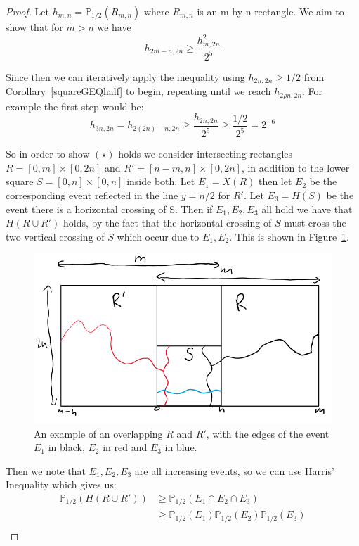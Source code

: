 \documentclass[a4paper,11pt]{article}
\theoremstyle{definition}
\newcommand{\prbhlf}{\mathbb{P}_{1/2}}
\begin{document}
\begin{proof}
	Let $h_{m,n} = \mathbb{P}_{1/2}(R_{m,n})$ where $R_{m,n}$ is an m by n rectangle. We aim to show that for $m>n$ we have
	\[
		h_{2m-n,2n} \geq \frac{h_{m,2n}^2}{2^5} \tag{$\star$}
	\]
	
	Since then we can iteratively apply the inequality using ${h_{2n,2n} \geq 1/2}$ from Corollary~\ref*{squareGEQhalf} to begin, repeating until we reach $h_{2\rho n,2n}$. For example the first step would be:
	$$h_{3n,2n} =h_{2(2n) -n,2n} \geq \frac{h_{2n,2n}}{2^5} \geq \frac{1/2}{2^5} = 2^{-6}$$

	So in order to show $(\star)$ holds we consider intersecting rectangles $R = [0,m]\times [0,2n]$ and $R' = [n-m,n] \times [0,2n]$, in addition to the lower square $S = [0,n] \times [0,n]$ inside both.
	Let $E_1 = X(R)$ then let $E_2$ be the corresponding event reflected in the line $y=n/2$ for $R'$. Let $E_3 = H(S)$ be the event there is a horizontal crossing of S.
	Then if $E_1,E_2,E_3$ all hold we have that $H(R \cup  R')$ holds, by the fact that the horizontal crossing of $S$ must cross the two vertical crossing of $S$ which occur due to $E_1,E_2$. This is shown in Figure~\ref{fig:doubleRectangle}.
	\begin{figure}
		\centering
		\includegraphics[scale=0.6]{drawings/doubleRectangle.png}
		\caption{An example of an overlapping $R$ and $R'$, with the edges of the event $E_1$ in black, $E_2$ in red and $E_3$ in blue.}
		\label{fig:doubleRectangle}
	\end{figure}
	Then we note that $E_1,E_2,E_3$ are all increasing events, so we can use Harris' Inequality which gives us:
	\begin{align*}
	\prbhlf(H(R \cup R')) &\geq \prbhlf(E_1 \cap E_2\cap E_3)\\
	& \geq \prbhlf(E_1)\prbhlf(E_2)\prbhlf(E_3)\\

\end{align*}
\end{proof}
\end{document}
